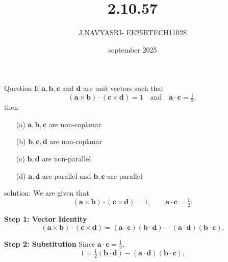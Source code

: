 \documentclass{beamer}
\title %
{2.10.57}
\date{september 2025}
\author %
{J.NAVYASRI- EE25BTECH11028}
\begin{document}
\frame{\titlepage}
\begin{frame}{Question}
If $\mathbf{a}, \mathbf{b}, \mathbf{c}$ and $\mathbf{d}$ are unit vectors such that 
\[
(\mathbf{a} \times \mathbf{b}) \cdot (\mathbf{c} \times \mathbf{d}) = 1
\quad \text{and} \quad 
\mathbf{a} \cdot \mathbf{c} = \tfrac{1}{2},
\]
then

\begin{enumerate}
    \item[(a)] $\mathbf{a}, \mathbf{b}, \mathbf{c}$ are non-coplanar
    \item[(b)] $\mathbf{b}, \mathbf{c}, \mathbf{d}$ are non-coplanar
    \item[(c)] $\mathbf{b}, \mathbf{d}$ are non-parallel
    \item[(d)] $\mathbf{a}, \mathbf{d}$ are parallel and $\mathbf{b}, \mathbf{c}$ are parallel
\end{enumerate}
\end{frame}

\begin{frame}{solution:}
We are given that 
\begin{equation}
(\mathbf{a} \times \mathbf{b}) \cdot (\mathbf{c} \times \mathbf{d}) = 1,
\qquad 
\mathbf{a} \cdot \mathbf{c} = \tfrac{1}{2}.
\end{equation}

\textbf{Step 1: Vector Identity}
\begin{equation}
(\mathbf{a} \times \mathbf{b}) \cdot (\mathbf{c} \times \mathbf{d})
= (\mathbf{a} \cdot \mathbf{c})(\mathbf{b} \cdot \mathbf{d}) 
- (\mathbf{a} \cdot \mathbf{d})(\mathbf{b} \cdot \mathbf{c}).
\end{equation}

\textbf{Step 2: Substitution}
Since $\mathbf{a}\cdot \mathbf{c}=\tfrac12$,
\begin{equation}
1 = \tfrac12 (\mathbf{b} \cdot \mathbf{d}) - (\mathbf{a} \cdot \mathbf{d})(\mathbf{b} \cdot \mathbf{c}).
\end{equation}
\end{frame}
\end{document}
